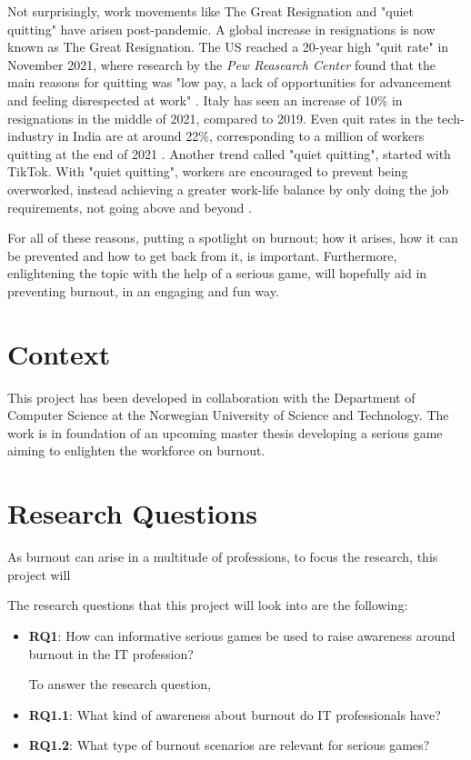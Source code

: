 Not surprisingly, work movements like The Great Resignation and "quiet quitting" have arisen post-pandemic. A global increase in resignations is now known as The Great Resignation. The US reached a 20-year high "quit rate" in November 2021, where research by the \textit{Pew Reasearch Center} found that the main reasons for quitting was "low pay, a lack of opportunities for advancement and feeling disrespected at work" \parencite{parker_majority_2022}. Italy has seen an increase of 10\% in resignations in the middle of 2021, compared to 2019. Even quit rates in the tech-industry in India are at around 22\%, corresponding to a million of workers quitting at the end of 2021 \parencite{armillei_si_2021}. Another trend called "quiet quitting", started with TikTok. With "quiet quitting", workers are encouraged to prevent being overworked, instead achieving a greater work-life balance by only doing the job requirements, not going above and beyond \parencite{rosalsky_economics_2022}.

For all of these reasons, putting a spotlight on burnout; how it arises, how it can be prevented and how to get back from it, is important. Furthermore, enlightening the topic with the help of a serious game, will hopefully aid in preventing burnout, in an engaging and fun way.

\section{Context}
This project has been developed in collaboration with the Department of Computer Science at the Norwegian University of Science and Technology. The work is in foundation of an upcoming master thesis developing a serious game aiming to enlighten the workforce on burnout. 

\section{Research Questions}

As burnout can arise in a multitude of professions, to focus the research, this project will 

The research questions that this project will look into are the following:

\begin{itemize}
    \item[] \textbf{RQ1}: How can informative serious games be used to raise awareness around burnout in the IT profession?

To answer the research question, 
    \item[] \textbf{RQ1.1}: What kind of awareness about burnout do IT professionals have?
    \item[] \textbf{RQ1.2}: What type of burnout scenarios are relevant  for serious games?
\end{itemize}

